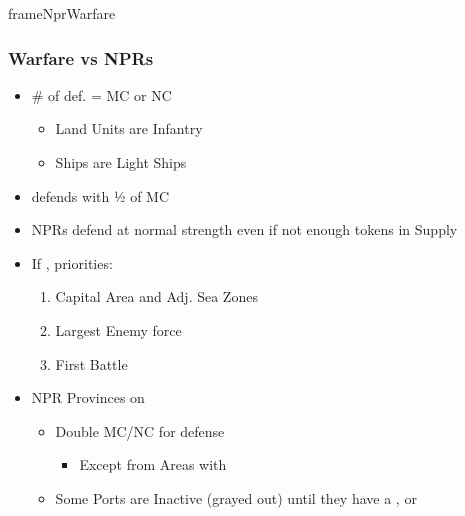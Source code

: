 \documentclass[10pt]{article}
\newlength{\fhNprWarfare} \setlength\fhNprWarfare{16\baselineskip}
\begin{document}
\begin{dynamiccontents*}{frameNprWarfare}\begin{eubox}{\fhNprWarfare}
	\subsubsection*{Warfare vs NPRs }
	\begin{itemize}
		\item \# of def.  = MC or NC
		\begin{itemize}
			\item Land Units are Infantry
			\item Ships are Light Ships
		\end{itemize}
		\item {} defends with ½ of MC
		\item NPRs defend at normal strength even if not enough tokens in Supply
		\item If , priorities:
		\begin{enumerate}
			\item Capital Area and Adj. Sea Zones
			\item Largest Enemy force
			\item First Battle
		\end{enumerate}
		\item NPR Provinces on 
		\begin{itemize}
			\item Double MC/NC for defense
			\begin{itemize}
				\item Except from Areas with \plague
			\end{itemize}
			\item Some Ports are Inactive (grayed out) until they have a \dnpr, \town or \vassal
		\end{itemize}
	\end{itemize}
\end{eubox}\end{dynamiccontents*}
\end{document}
